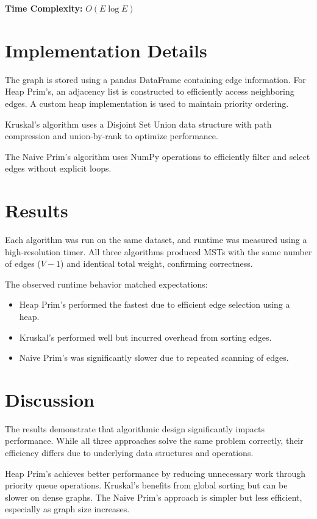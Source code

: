 \documentclass[11pt]{article}
\begin{document}
\textbf{Time Complexity:} $O(E \log E)$

\section{Implementation Details}

The graph is stored using a pandas DataFrame containing edge information. For Heap Prim’s, an adjacency list is constructed to efficiently access neighboring edges. A custom heap implementation is used to maintain priority ordering.

Kruskal’s algorithm uses a Disjoint Set Union data structure with path compression and union-by-rank to optimize performance.

The Naive Prim’s algorithm uses NumPy operations to efficiently filter and select edges without explicit loops.

\section{Results}

Each algorithm was run on the same dataset, and runtime was measured using a high-resolution timer. All three algorithms produced MSTs with the same number of edges ($V - 1$) and identical total weight, confirming correctness.

The observed runtime behavior matched expectations:

\begin{itemize}
\item Heap Prim’s performed the fastest due to efficient edge selection using a heap.
\item Kruskal’s performed well but incurred overhead from sorting edges.
\item Naive Prim’s was significantly slower due to repeated scanning of edges.
\end{itemize}

\section{Discussion}

The results demonstrate that algorithmic design significantly impacts performance. While all three approaches solve the same problem correctly, their efficiency differs due to underlying data structures and operations.

Heap Prim’s achieves better performance by reducing unnecessary work through priority queue operations. Kruskal’s benefits from global sorting but can be slower on dense graphs. The Naive Prim’s approach is simpler but less efficient, especially as graph size increases.
\end{document}
